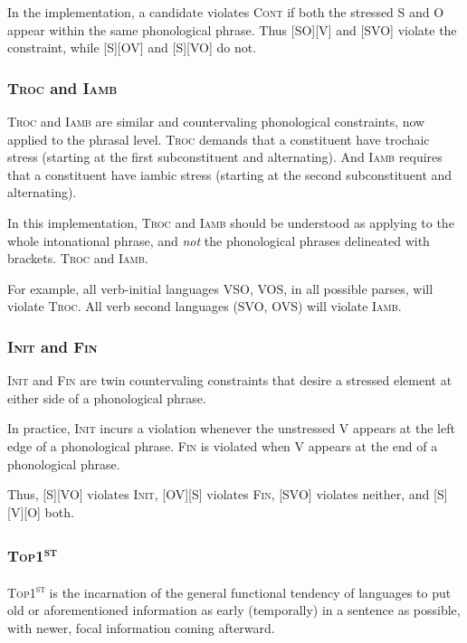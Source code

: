 \documentclass{article}
\newcommand{\cont}{\textsc{Cont}}
\newcommand{\iamb}{\textsc{Iamb}}
\newcommand{\topf}{\textsc{Top1\textsuperscript{st}}}
\newcommand{\finphi}{\textsc{Fin\textphi}}
\newcommand{\initphi}{\textsc{Init\textphi}}
\newcommand{\troc}{\textsc{Troc}}
\begin{document}
In the implementation, a candidate violates {\cont} if both the stressed S and O appear within the same phonological phrase. Thus [SO][V] and [SVO] violate the constraint, while [S][OV] and [S][VO] do not.

\subsubsection{{\troc} and {\iamb}}

\textcite{selkirk11}

{\troc} and {\iamb} are similar and countervaling phonological constraints, now applied to the phrasal level. {\troc} demands that a constituent have trochaic stress (starting at the first subconstituent and alternating). And {\iamb} requires that a constituent have iambic stress (starting at the second subconstituent and alternating).

In this implementation, {\troc} and {\iamb} should be understood as applying to the whole intonational phrase, and \emph{not} the phonological phrases delineated with brackets. {\troc} and {\iamb}.

For example, all verb-initial languages VSO, VOS, in all possible parses, will violate {\troc}. All verb second languages (SVO, OVS) will violate {\iamb}.

\subsubsection{{\initphi} and {\finphi}}

{\initphi} and {\finphi} are twin countervaling constraints that desire a stressed element at either side of a phonological phrase.

In practice, {\initphi} incurs a violation whenever the unstressed V appears at the left edge of a phonological phrase. {\finphi} is violated when V appears at the end of a phonological phrase.

Thus, [S][VO] violates {\initphi}, [OV][S] violates {\finphi}, [SVO] violates neither, and [S][V][O] both.


\subsubsection{\topf}

{\topf} is the incarnation of the general functional tendency of languages to put old or aforementioned information as early (temporally) in a sentence as possible, with newer, focal information coming afterward.
\end{document}
